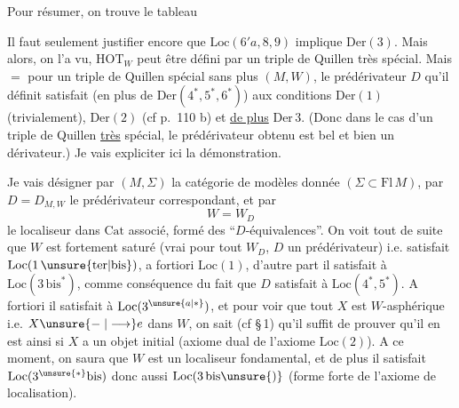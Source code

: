 Pour résumer, on trouve le tableau

 Il faut seulement justifier encore que $\mathrm{Loc}(6'a,8,9)$ implique $\mathrm{Der}(3)$. Mais alors, on l'a vu, $\mathrm{HOT}_W$ peut être défini par un triple de Quillen très spécial. Mais \ensuremath{=} pour un triple de Quillen spécial sans plus $(M,W)$, le prédérivateur $D$ qu'il définit satisfait (en plus de $\mathrm{Der}(4^*,5^*,6^*)$) aux conditions $\mathrm{Der}(1)$ (trivialement), $\mathrm{Der}(2)$
(cf p.~110  b) et \uline{de plus} $\mathrm{Der}\,3$. (Donc dans le cas d'un triple de Quillen \uline{très} spécial, le prédérivateur obtenu est bel et bien un dérivateur.) Je vais expliciter ici la démonstration.

 Je vais désigner par $(M,\Sigma)$ la catégorie de modèles donnée $(\Sigma\subset\mathrm{Fl}\,M)$,  par $D=D_{M,W}$ le prédérivateur correspondant, et par
\[
W=W_D
\]
le localiseur dans $\mathrm{Cat}$ associé, formé des ``$D$-équivalences''. On voit tout de suite que $W$ est fortement saturé (vrai pour tout $W_D$, $D$ un prédérivateur) i.e. satisfait $\mathrm{Loc}(1\,\unsure{\mathrm{ter}|\mathrm{bis}})$, a fortiori $\mathrm{Loc}(1)$, d'autre part il satisfait à $\mathrm{Loc}(3\,\mathrm{bis}^*)$, comme conséquence du fait que $D$ satisfait à $\mathrm{Loc}(4^*,5^*)$. A fortiori il satisfait à $\mathrm{Loc}(3^{\unsure{a|*}})$, et pour voir que tout $X$   est $W$-asphérique i.e. $X\unsure{\relbar|\longrightarrow}e$ dans $W$, on sait (cf \S\,1)
qu'il suffit de prouver qu'il en est ainsi si $X$ a un objet initial (axiome  dual de l'axiome $\mathrm{Loc}(2)$). A ce moment, on saura que $W$ est un localiseur fondamental, et de plus il satisfait $\mathrm{Loc}(3^{\unsure{*}}\mathrm{bis})$ donc aussi $\mathrm{Loc}(3\,\mathrm{bis}\unsure{)}$ (forme forte de l'axiome de localisation).

